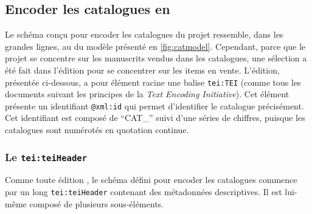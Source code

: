 
\subsection{Encoder les catalogues en \tei{}}
Le schéma conçu pour encoder les catalogues du projet \mssktb{} ressemble, dans les grandes lignes, au du modèle présenté en \ref{fig:catmodel}. Cependant, parce que le projet se concentre sur les manuscrits vendus dans les catalogues, une sélection a été fait dans l'édition pour se concentrer sur les items en vente. L'édition, présentée ci-dessous, a pour élément racine une balise \texttt{tei:TEI} (comme tous les documents suivant les principes de la \textit{Text Encoding Initiative}). Cet élément présente un identifiant \texttt{@xml:id} qui permet d'identifier le catalogue précisément. Cet identifiant est composé de \enquote{CAT\_} suivi d'une séries de chiffres, puisque les catalogues sont numérotés en quotation continue.

\subsubsection{Le \texttt{tei:teiHeader}}
Comme toute édition \tei{}, le schéma défini pour encoder les catalogues commence par un long \texttt{tei:teiHeader} contenant des métadonnées descriptives. Il est lui-même composé de plusieurs sous-éléments. 

